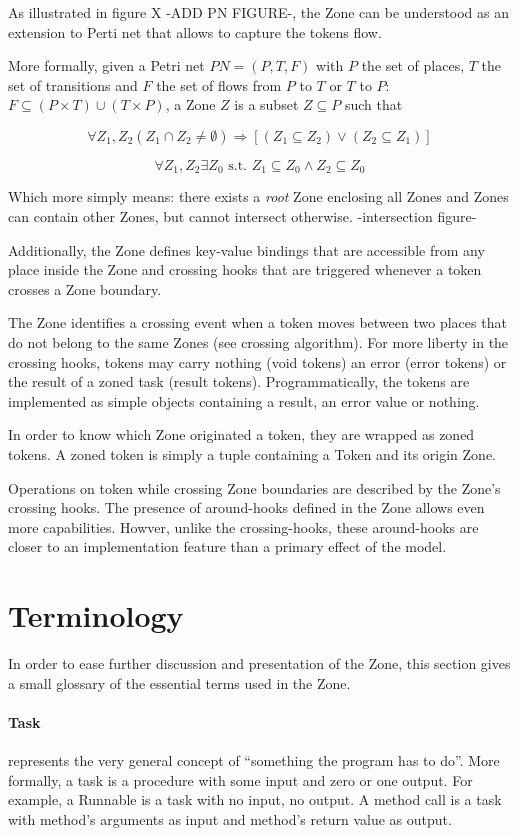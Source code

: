 As illustrated in figure X -ADD PN FIGURE-, the Zone can be understood as an extension to Perti net that allows to capture the tokens flow.

More formally, given a Petri net $PN = (P, T, F)$ with $P$ the set of places, $T$ the set of transitions and $F$ the set of flows from $P$ to $T$ or $T$ to $P$: $F \subseteq (P \times T) \cup (T \times P)$, a Zone $Z$ is a subset $Z \subseteq P$ such that

$$\forall Z_1, Z_2 (Z_1 \cap Z_2 \neq \emptyset) \Rightarrow [(Z_1 \subseteq Z_2) \lor (Z_2 \subseteq Z_1)] $$

$$\forall Z_1, Z_2 \exists Z_0 \text{ s.t. } Z_1 \subseteq Z_0 \land Z_2 \subseteq Z_0 $$

Which more simply means: there exists a \emph{root} Zone enclosing all Zones and Zones can contain other Zones, but cannot intersect otherwise. -intersection figure-

Additionally, the Zone defines key-value bindings that are accessible from any place inside the Zone and crossing hooks that are triggered whenever a token crosses a Zone boundary.

The Zone identifies a crossing event when a token moves between two places that do not belong to the same Zones (see crossing algorithm). For more liberty in the crossing hooks, tokens may carry nothing (void tokens) an error (error tokens) or the result of a zoned task (result tokens). Programmatically, the tokens are implemented as simple objects containing a result, an error value or nothing.

In order to know which Zone originated a token, they are wrapped as zoned tokens. A zoned token is simply a tuple containing a Token and its origin Zone.

Operations on token while crossing Zone boundaries are described by the Zone's crossing hooks.
The presence of around-hooks defined in the Zone allows even more capabilities. Howver, unlike the crossing-hooks, these around-hooks are closer to an implementation feature than a primary effect of the model.

\section{Terminology}

In order to ease further discussion and presentation of the Zone, this section gives a small glossary of the essential terms used in the Zone.


\paragraph{Task} represents the very general concept of ``something the program has to do''. More formally, a task is a procedure with some input and zero or one output. For example, a Runnable is a task with no input, no output. A method call is a task with method's arguments as input and method's return value as output.

